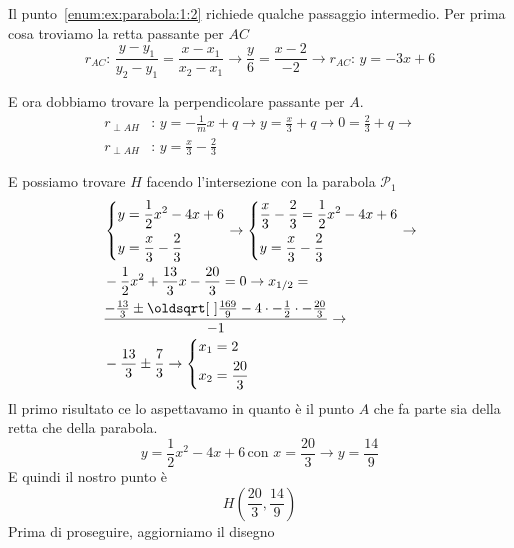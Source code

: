 Il punto~\ref{enum:ex:parabola:1:2} richiede qualche passaggio intermedio. Per prima cosa troviamo
la retta passante per $AC$
\begin{equation*}
  r_{AC}:\, \frac{y-y_1}{y_2-y_1} = \frac{x-x_1}{x_2-x_1} \rightarrow \frac{y}{6}=\frac{x-2}{-2}
  \rightarrow r_{AC}:\,y=-3x+6
\end{equation*}

E ora dobbiamo trovare la perpendicolare passante per $A$.
\begin{align*}
  r_{\perp AH}&:\,y=-\frac{1}{m}x+q \rightarrow y=\frac{x}{3}+q\rightarrow 0=\frac{2}{3}+q \rightarrow\\
  r_{\perp AH}&:\,y=\frac{x}{3}-\frac{2}{3}
\end{align*}

E possiamo trovare $H$ facendo l'intersezione con la parabola $\mathscr{P}_1$
\begin{align*}
  &\begin{dcases}
  y = \frac{1}{2}x^2-4x+6\\
  y=\frac{x}{3}-\frac{2}{3}
\end{dcases}\rightarrow
\begin{dcases}
  \frac{x}{3}-\frac{2}{3} = \frac{1}{2}x^2-4x+6\\
  y=\frac{x}{3}-\frac{2}{3}
\end{dcases}\rightarrow\\
&-\frac{1}{2}x^2+\frac{13}{3}x-\frac{20}{3}=0 \rightarrow 
x_{1/2} = \\
&\frac{-\frac{13}{3}\pm\sqrt{\frac{169}{9}-4\cdot-\frac{1}{2}\cdot-\frac{20}{3}}}{-1} 
\rightarrow\\ &-\frac{13}{3}\pm\frac{7}{3}\rightarrow\begin{dcases}
  x_1 = 2\\
  x_2 = \frac{20}{3}
\end{dcases}
\end{align*}
Il primo risultato ce lo aspettavamo in quanto è il punto $A$ che fa parte sia della retta che della
parabola.
\begin{equation*}
  y = \frac{1}{2}x^2-4x+6 \, \text{con } x = \frac{20}{3} \rightarrow y = \frac{14}{9}
\end{equation*}
E quindi il nostro punto è
\begin{equation*}
  H\left(\frac{20}{3},\frac{14}{9}\right)
\end{equation*}
Prima di proseguire, aggiorniamo il disegno
